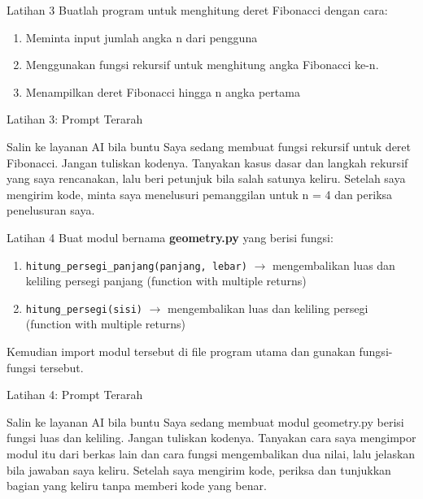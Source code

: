 \documentclass[aspectratio=169, table]{beamer}
\begin{document}
\begin{frame}[fragile,allowframebreaks=0.8]{Latihan 3}
\footnotesize
Buatlah program untuk menghitung deret Fibonacci dengan cara:
    \begin{enumerate}
        \item Meminta input jumlah angka n dari pengguna
        \item Menggunakan fungsi rekursif untuk menghitung angka Fibonacci ke-n.
        \item Menampilkan deret Fibonacci hingga n angka pertama
    \end{enumerate}
\end{frame}

\begin{frame}{Latihan 3: Prompt Terarah}
\begin{block}{Salin ke layanan AI bila buntu}
\small Saya sedang membuat fungsi rekursif untuk deret Fibonacci. Jangan tuliskan kodenya. Tanyakan kasus dasar dan langkah rekursif yang saya rencanakan, lalu beri petunjuk bila salah satunya keliru. Setelah saya mengirim kode, minta saya menelusuri pemanggilan untuk n = 4 dan periksa penelusuran saya.
\end{block}
\end{frame}

\begin{frame}[fragile,allowframebreaks=0.8]{Latihan 4}
\footnotesize
Buat modul bernama \textbf{geometry.py} yang berisi fungsi:
    \begin{enumerate}
        \item \texttt{hitung_persegi_panjang(panjang, lebar)} $\rightarrow$ mengembalikan luas dan keliling persegi panjang (function with multiple returns)
        \item \texttt{hitung_persegi(sisi)} $\rightarrow$ mengembalikan luas dan keliling persegi (function with multiple returns)
    \end{enumerate}
    Kemudian import modul tersebut di file program utama dan gunakan fungsi-fungsi tersebut.
\end{frame}

\begin{frame}{Latihan 4: Prompt Terarah}
\begin{block}{Salin ke layanan AI bila buntu}
\small Saya sedang membuat modul geometry.py berisi fungsi luas dan keliling. Jangan tuliskan kodenya. Tanyakan cara saya mengimpor modul itu dari berkas lain dan cara fungsi mengembalikan dua nilai, lalu jelaskan bila jawaban saya keliru. Setelah saya mengirim kode, periksa dan tunjukkan bagian yang keliru tanpa memberi kode yang benar.
\end{block}
\end{frame}
\end{document}

